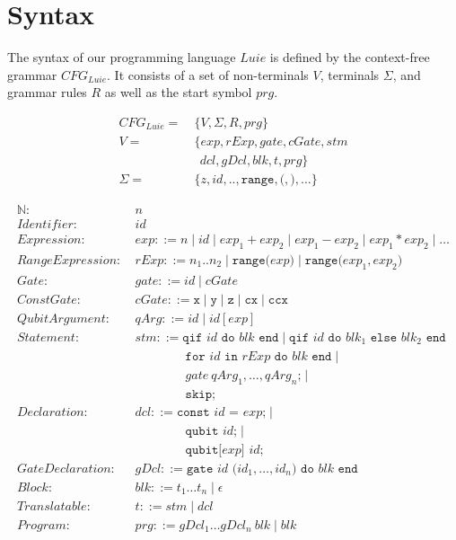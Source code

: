 \section{Syntax}
\label{sec:concept_abstractGrammar}
The syntax of our programming language $Luie$ is defined by the context-free grammar $CFG_{Luie}$. It consists of a set of non-terminals $V$, terminals $\Sigma$, and grammar rules $R$ as well as the start symbol $prg$.

\begin{align*}
    CFG_{Luie} = \ & \{V, \Sigma, R, prg \}\\ 
    V = \ & \{ exp, rExp, gate, cGate, stm\\ 
            & \ \ dcl, gDcl, blk, t, prg\}\\ 
    \Sigma = \ & \{ z, id, \texttt{..}, \texttt{range}, \texttt{(}, \texttt{)}, \dots\} 
\end{align*}



\begin{align*}
    \mathbb{N}: \ & n \\
    Identifier: \ & id \\
    Expression: \ & exp ::= n \mid id \mid exp_1 + exp_2 \mid exp_1 - exp_2 \mid exp_1 * exp_2 \mid \dots\\
    RangeExpression: \ & rExp ::= n_1 .. n_2 \mid \texttt{range(} exp \texttt{)} \mid \texttt{range(} exp_1, exp_2 \texttt{)}\\
    Gate: \ & gate ::= id \mid cGate\\
    ConstGate: \ & cGate ::= \texttt{x} \mid \texttt{y} \mid \texttt{z} \mid \texttt{cx} \mid \texttt{ccx}\\
    QubitArgument: \ & qArg ::= id \mid id[exp]\\
    Statement: \ & stm ::= \texttt{qif } id \texttt{ do }  blk \texttt{ end} \mid \texttt{qif } id \texttt{ do }  blk_1 \texttt{ else } blk_2 \texttt{ end}  \\
               & \quad \quad \quad \quad \texttt{for } id \texttt{ in } rExp \texttt{ do } blk \texttt{ end} \mid \\
               & \quad \quad \quad \quad gate \ qArg_1, \dots, qArg_n \texttt{;} \mid \\
               & \quad \quad \quad \quad \texttt{skip;}\\
    Declaration: \ & dcl ::= \texttt{const } id \texttt{ = } exp \texttt{;} \mid \\
                 & \quad \quad \quad \quad \texttt{qubit } id \texttt{;} \mid \\
                 & \quad \quad \quad \quad \texttt{qubit[} exp \texttt{] } id \texttt{;}\\
    GateDeclaration: \ & gDcl::= \texttt{gate } id \texttt{ (}id_1, \dots, id_n\texttt{) do } blk \texttt{ end}\\
    Block: \ & blk::= t_1 \dots t_n \mid \epsilon\\
    Translatable : \ & t::= stm \mid dcl\\
    Program: \ & prg ::= gDcl_1 \dots gDcl_n \ blk \mid blk 
\end{align*}


